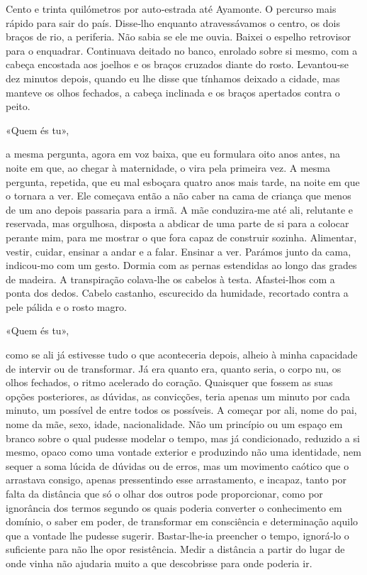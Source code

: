 Cento e trinta quilómetros por auto­‑estrada até Ayamonte. O percurso
mais rápido para sair do país. Disse­‑lho enquanto atravessávamos o
centro, os dois braços de rio, a periferia. Não sabia se ele me ouvia.
Baixei o espelho retrovisor para o enquadrar. Continuava deitado no
banco, enrolado sobre si mesmo, com a cabeça encostada aos joelhos e os
braços cruzados diante do rosto. Levantou­‑se dez minutos depois, quando
eu lhe disse que tínhamos deixado a cidade, mas manteve os olhos
fechados, a cabeça inclinada e os braços apertados contra o peito.

«Quem és tu»,

a mesma pergunta, agora em voz baixa, que eu formulara oito anos antes,
na noite em que, ao chegar à maternidade, o vira pela primeira vez. A
mesma pergunta, repetida, que eu mal esboçara quatro anos mais tarde, na
noite em que o tornara a ver. Ele começava então a não caber na cama de
criança que menos de um ano depois passaria para a irmã. A mãe
conduzira­‑me até ali, relutante e reservada, mas orgulhosa, disposta a
abdicar de uma parte de si para a colocar perante mim, para me mostrar o
que fora capaz de construir sozinha. Alimentar, vestir, cuidar, ensinar
a andar e a falar. Ensinar a ver. Parámos junto da cama, indicou­‑mo com
um gesto. Dormia com as pernas estendidas ao longo das grades de
madeira. A transpiração colava­‑lhe os cabelos à testa. Afastei­‑lhos
com a ponta dos dedos. Cabelo castanho, escurecido da humidade,
recortado contra a pele pálida e o rosto magro.

«Quem és tu»,

como se ali já estivesse tudo o que aconteceria depois, alheio à minha
capacidade de intervir ou de transformar. Já era quanto era, quanto
seria, o corpo nu, os olhos fechados, o ritmo acelerado do coração.
Quaisquer que fossem as suas opções posteriores, as dúvidas, as
convicções, teria apenas um minuto por cada minuto, um possível de entre
todos os possíveis. A começar por ali, nome do pai, nome da mãe, sexo,
idade, nacionalidade. Não um princípio ou um espaço em branco sobre o
qual pudesse modelar o tempo, mas já condicionado, reduzido a si mesmo,
opaco como uma vontade exterior e produzindo não uma identidade, nem
sequer a soma lúcida de dúvidas ou de erros, mas um movimento caótico
que o arrastava consigo, apenas pressentindo esse arrastamento, e
incapaz, tanto por falta da distância que só o olhar dos outros pode
proporcionar, como por ignorância dos termos segundo os quais poderia
converter o conhecimento em domínio, o saber em poder, de transformar em
consciência e determinação aquilo que a vontade lhe pudesse sugerir.
Bastar­‑lhe­‑ia preencher o tempo, ignorá­‑lo o suficiente para não lhe
opor resistência. Medir a distância a partir do lugar de onde vinha não
ajudaria muito a que descobrisse para onde poderia ir.

